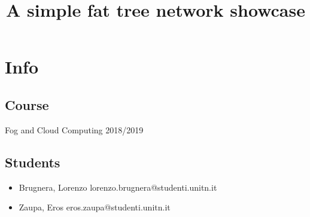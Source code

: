 \documentclass[11pt]{article}
\date{}
\title{A simple fat tree network showcase}
\begin{document}
\maketitle
\section*{Info}
\label{sec-1}
\subsection*{Course}
\label{sec-1-1}
Fog and Cloud Computing 2018/2019
\subsection*{Students}
\label{sec-1-2}
\begin{itemize}
\item Brugnera, Lorenzo lorenzo.brugnera@studenti.unitn.it
\item Zaupa, Eros eros.zaupa@studenti.unitn.it
\end{itemize}
\end{document}
